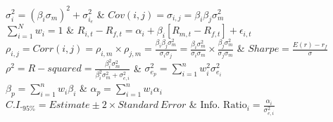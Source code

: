 $\sigma^{2}_{i} = (\beta_{i}\sigma_{m})^{2} + \sigma^{2}_{i_{e}}$ & $Cov(i,j) = \sigma_{i,j} = \beta_{i}\beta_{j}\sigma_{m}^{2}$ \\

$\sum_{i=1}^{N} w_{i} = 1$ & $R_{i,t} - R_{f,t} = \alpha_{i} + \beta_{i}[R_{m,t}-R_{f,t}]+\epsilon_{i,t}$ \\

$\rho_{i,j} = Corr(i,j) = \rho_{i,m} \times \rho_{j,m} =  \frac{\beta_{i}\beta_{j}\sigma^{2}_{m}}{\sigma_{i}\sigma_{j}} = \frac{\beta_{i}\sigma^{2}_{m}}{\sigma_{i}\sigma_{m}} \times \frac{\beta_{j}\sigma^{2}_{m}}{\sigma_{j}\sigma_{m}}  $ & $Sharpe = \frac{E(r) - r_{f}}{\sigma}$ \\


$\rho^{2} = R-squared = \frac{\beta_{i}^2\sigma_{m}^{2}}{\beta_{i}^2\sigma_{m}^{2} + \sigma_{e,i}^{2}} $ & $\sigma_{e_{p}}^{2} = \sum_{i=1}^{n} w_{i}^{2}\sigma_{e_{i}}^{2}$ \\


$\beta_{p} = \sum_{i=1}^{n} w_{i} \beta_{i} $ & $\alpha_{p} = \sum_{i=1}^{n} w_{i} \alpha_{i}$ \\


$C.I._{95\%} = Estimate \pm 2 \times Standard \: Error $ & $\text{Info. Ratio}_{i} = \frac{\alpha_{i}}{\sigma^{2}_{e,i}}$ \\